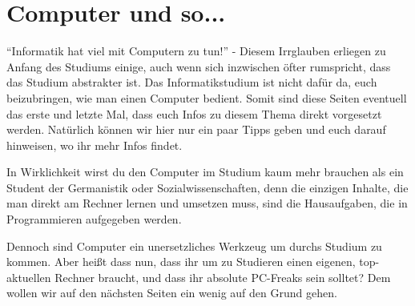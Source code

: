 \section{Computer und so...}
"`Informatik hat viel mit Computern zu tun!"' - Diesem Irrglauben erliegen zu
Anfang des Studiums einige, auch wenn sich inzwischen öfter rumspricht, dass
das Studium abstrakter ist. Das Informatikstudium ist nicht dafür da, euch beizubringen, wie man einen
Computer bedient. Somit sind diese Seiten eventuell das erste und letzte Mal, 
dass euch Infos zu diesem Thema direkt vorgesetzt werden. Natürlich können wir
hier nur ein paar Tipps geben und euch darauf hinweisen, wo ihr mehr Infos 
findet.

In Wirklichkeit wirst du den Computer im Studium kaum mehr brauchen als ein
Student der Germanistik oder Sozialwissenschaften, denn die einzigen Inhalte, 
die man direkt am Rechner lernen und umsetzen muss, sind die Hausaufgaben, 
die in Programmieren aufgegeben werden.

Dennoch sind Computer ein unersetzliches Werkzeug um durchs Studium zu kommen.
Aber heißt dass nun, dass ihr um zu Studieren einen eigenen, top-aktuellen Rechner
braucht, und dass ihr absolute PC-Freaks sein solltet? Dem wollen wir auf den 
nächsten Seiten ein wenig auf den Grund gehen.






